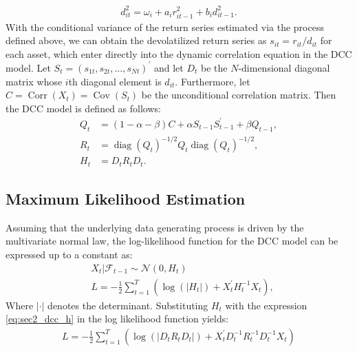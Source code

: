 \begin{align}
	d_{it}^2 = \omega_i + a_i r_{it-1}^2 + b_i d_{it-1}^2.
\end{align}
With the conditional variance of the return series estimated via the process defined above, we can obtain the devolatilized return series as $s_{it} = r_{it}/d_{it}$ for each asset, which enter directly into the dynamic correlation equation in the DCC model. Let $S_{t} = (s_{1t}, s_{2t}, \dots , s_{Nt})^\prime$ and let $D_t$ be the $N$-dimensional diagonal matrix whose $i$th diagonal element is $d_{it}$. Furthermore, let $C = \operatorname{Corr}(X_t) = \operatorname{Cov}(S_t)$ be the unconditional correlation matrix. Then the DCC model is defined as follows:
\begin{align}
	Q_t &= (1 - \alpha - \beta)C + \alpha S_{t-1} S_{t-1}^\prime + \beta Q_{t-1}, \label{eq:sec2_dcc_q} \\
	R_t &= \operatorname{diag}(Q_t)^{-1/2} Q_t \operatorname{diag}(Q_t)^{-1/2}, \label{eq:sec2_dcc_r} \\
	H_t &= D_t R_t D_t. \label{eq:sec2_dcc_h}
\end{align}

\subsection{Maximum Likelihood Estimation}

Assuming that the underlying data generating process is driven by the multivariate normal law, the log-likelihood function for the DCC model can be expressed up to a constant as:
\begin{align}
	&X_t | \mathcal{F}_{t-1} \sim \mathcal{N}(0,H_t)\, \\
	&L = -\frac{1}{2} \sum_{t=1}^T (\operatorname{log} \left( \left| H_t \right| \right) + X_t^\prime H_t^{-1} X_t), \label{eq:sec2_log_like_1}
\end{align}
Where $|\cdot|$ denotes the determinant. Substituting $H_t$ with the expression \eqref{eq:sec2_dcc_h} in the log likelihood function yields:
\begin{align}
	L = -\frac{1}{2} \sum_{t=1}^T (\operatorname{log}(|D_tR_tD_t|) + X_t^\prime D_t^{-1}R_t^{-1}D_t^{-1}X_t )
\end{align}

